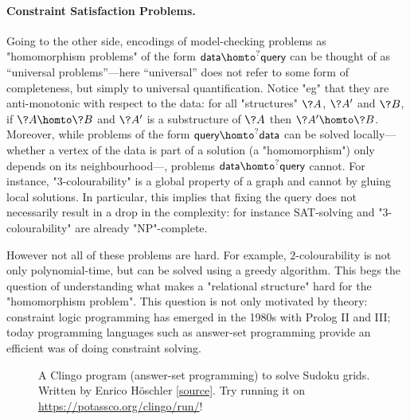 \paragraph*{Constraint Satisfaction Problems.}
Going to the other side, encodings of model-checking problems
as "homomorphism problems" of the form $\textsf{data} \homto^? \textsf{query}$
can be thought of as ``universal problems''---here ``universal'' does not
refer to some form of completeness, but simply to universal quantification.
Notice "eg" that they are anti-monotonic with respect to the data:
for all "structures" $\?A$, $\?A'$ and $\?B$, if $\?A \homto \?B$ and $\?A'$ is a substructure
of $\?A$ then $\?A' \homto \?B$.
Moreover, while problems of the form $\textsf{query} \homto^? \textsf{data}$
can be solved locally---whether a vertex of the data is part of a solution (a "homomorphism") only 
depends on its neighbourhood---, problems $\textsf{data} \homto^? \textsf{query}$ cannot.
For instance, "$3$-colourability" is a global property of a graph and cannot by gluing local 
solutions. In particular, this implies that fixing the query does not necessarily result in
a drop in the complexity: for instance SAT-solving and "$3$-colourability" are already "NP"-complete.

However not all of these problems are hard. For example, $2$-colourability is not only polynomial-time,
but can be solved using a greedy algorithm. This begs the question of understanding what
makes a "relational structure" hard for the "homomorphism problem".
This question is not only motivated by theory: constraint logic programming has emerged in the 1980s
with Prolog II and III; today programming languages such as answer-set programming provide an 
efficient was of doing constraint solving.

\begin{figure}
	\centering
	
	\caption{
		\AP\label{fig:ex-sudoku-asp}
		A Clingo program (answer-set programming) to solve Sudoku grids.
		Written by Enrico Höschler
		\href{https://ddmler.github.io/asp/2018/07/10/answer-set-programming-sudoku-solver.html}{[source]}.
		Try running it on \url{https://potassco.org/clingo/run/}!
	}
\end{figure}


